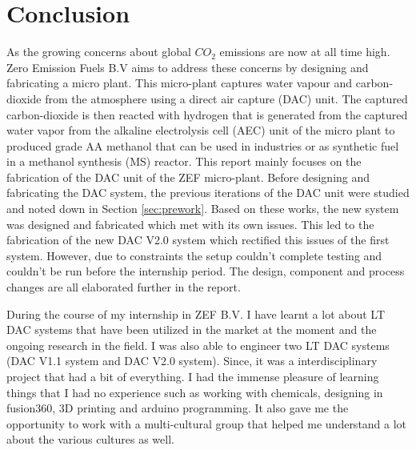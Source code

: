 \section{Conclusion}
\label{sec:conc}

As the growing concerns about global $CO_2$ emissions are now at all time high. Zero Emission Fuels B.V aims to address these concerns by designing and fabricating a micro plant. This micro-plant captures water vapour and carbon-dioxide from the atmosphere using a direct air capture (DAC) unit. The captured carbon-dioxide is then reacted with hydrogen that is generated from the captured water vapor from the alkaline electrolysis cell (AEC) unit of the micro plant to produced grade AA methanol that can be used in industries or as synthetic fuel in a methanol synthesis (MS) reactor.   
\bigbreak
\noindent
This report mainly focuses on the fabrication of the DAC unit of the ZEF micro-plant. Before designing and fabricating the DAC system, the previous iterations of the DAC unit were studied and noted down in Section \ref{sec:prework}. Based on these works, the new system was designed and fabricated which met with its own issues. This led to the fabrication of the new DAC V2.0 system which rectified this issues of the first system. However, due to constraints the setup couldn't complete testing and couldn't be run before the internship period. The design, component and process changes are all elaborated further in the report.    

\bigbreak
\noindent During the course of my internship in ZEF B.V. I have learnt a lot about LT DAC systems that have been utilized in the market at the moment and the ongoing research in the field. I was also able to engineer two LT DAC systems (DAC V1.1 system and DAC V2.0 system). Since, it was a interdisciplinary project that had a bit of everything. I had the immense pleasure of learning things that I had no experience such as working with chemicals, designing in fusion360, 3D printing and arduino programming. It also gave me the opportunity to work with a multi-cultural group that helped me understand a lot about the various cultures as well. 
